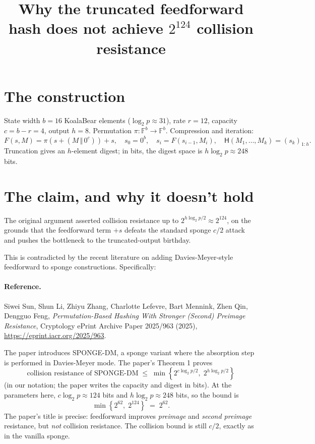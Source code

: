 \documentclass[11pt]{article}
\title{Why the truncated feedforward hash does not achieve $2^{124}$ collision resistance}
\author{}
\date{}
\begin{document}
\maketitle

\section*{The construction}

State width $b=16$ KoalaBear elements (${\log_2 p \approx 31}$), rate $r=12$, capacity $c=b-r=4$, output $h=8$. Permutation $\pi:\mathbb{F}^b \to \mathbb{F}^b$. Compression and iteration:
\[
F(s, M) = \pi(s + (M\,\Vert\,0^c)) + s, \quad s_0 = 0^b, \quad s_i = F(s_{i-1}, M_i), \quad \mathsf{H}(M_1,\dots,M_k) = (s_k)_{1:h}.
\]
Truncation gives an $h$-element digest; in bits, the digest space is $h \log_2 p \approx 248$ bits.

\section*{The claim, and why it doesn't hold}

The original argument asserted collision resistance up to $2^{h \log_2 p / 2} \approx 2^{124}$, on the grounds that the feedforward term $+s$ defeats the standard sponge $c/2$ attack and pushes the bottleneck to the truncated-output birthday.

This is contradicted by the recent literature on adding Davies-Meyer-style feedforward to sponge constructions. Specifically:

\paragraph{Reference.} Siwei Sun, Shun Li, Zhiyu Zhang, Charlotte Lefevre, Bart Mennink, Zhen Qin, Dengguo Feng, \emph{Permutation-Based Hashing With Stronger (Second) Preimage Resistance}, Cryptology ePrint Archive Paper 2025/963 (2025), \url{https://eprint.iacr.org/2025/963}.

The paper introduces SPONGE-DM, a sponge variant where the absorption step is performed in Davies-Meyer mode. The paper's Theorem 1 proves
\[
\text{collision resistance of SPONGE-DM} \;\le\; \min\!\left\{2^{c\log_2 p/2},\; 2^{h\log_2 p/2}\right\}
\]
(in our notation; the paper writes the capacity and digest in bits). At the parameters here, $c \log_2 p \approx 124$ bits and $h \log_2 p \approx 248$ bits, so the bound is
\[
\min\!\left\{2^{62},\; 2^{124}\right\} \;=\; 2^{62}.
\]
The paper's title is precise: feedforward improves \emph{preimage} and \emph{second preimage} resistance, but \emph{not} collision resistance. The collision bound is still $c/2$, exactly as in the vanilla sponge.
\end{document}
